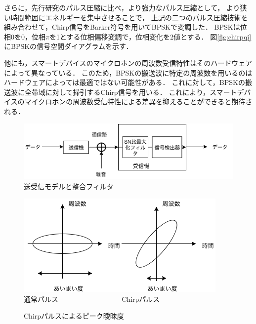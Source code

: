 さらに，先行研究\cite{shibata13}のパルス圧縮に比べ，より強力なパルス圧縮として，
より狭い時間範囲にエネルギーを集中させることで，
上記の二つのパルス圧縮技術を組み合わせて，Chirp信号をBarker符号を用いてBPSKで変調した．
BPSKは位相0を0，位相$\pi$を1とする位相偏移変調で，位相変化を2値とする．
図\ref{fig:chirpqi}にBPSKの信号空間ダイアグラムを示す．

他にも，スマートデバイスのマイクロホンの周波数受信特性はそのハードウェアによって異なっている．
このため，BPSKの搬送波に特定の周波数を用いるのはハードウェアによっては最適ではない可能性がある．
これに対して，BPSKの搬送波に全帯域に対して掃引するChirp信号を用いる．
これにより，スマートデバイスのマイクロホンの周波数受信特性による差異を抑えることができると期待される．

\begin{figure}[pb]\centering
\includegraphics[clip,width=1.05\hsize]{img/matched_filter.png}
\caption{送受信モデルと整合フィルタ}\label{fig:matched_filter}

\end{figure}



\begin{figure}[pb]\centering
\includegraphics[clip,width=0.9\hsize]{img/aimai.png}\\
通常パルス~ ~ ~ ~ ~ ~ ~ ~ ~ ~ ~ Chirpパルス
\caption{Chirpパルスによるピーク曖昧度}\label{fig:chirppulse_amb}

\end{figure}

